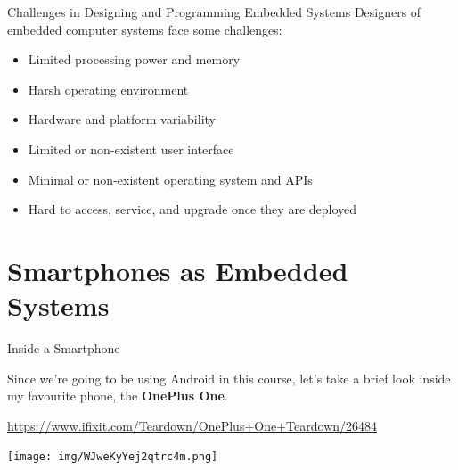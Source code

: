\documentclass[aspectratio=169]{beamer}
\begin{document}
\begin{frame}{Challenges in Designing and Programming Embedded Systems}
Designers of embedded computer systems face some challenges: \\
\begin{itemize}
\item Limited processing power and memory
\item Harsh operating environment
\item Hardware and platform variability
\item Limited or non-existent user interface
\item Minimal or non-existent operating system and APIs
\item Hard to access, service, and upgrade once they are deployed
\end{itemize}
\end{frame}



\section{Smartphones as Embedded Systems}	



	\begin{frame}{Inside a Smartphone}
		
		Since we're going to be using Android in this course, let's take a brief look
		inside my favourite phone, the {\bf OnePlus One}.
		
		\href{https://www.ifixit.com/Teardown/OnePlus+One+Teardown/26484}{https://www.ifixit.com/Teardown/OnePlus+One+Teardown/26484}
		
		\vspace{1em}		
		
		\centering
		\texttt{[image: img/WJweKyYej2qtrc4m.png]}
			
	\end{frame}
\end{document}
